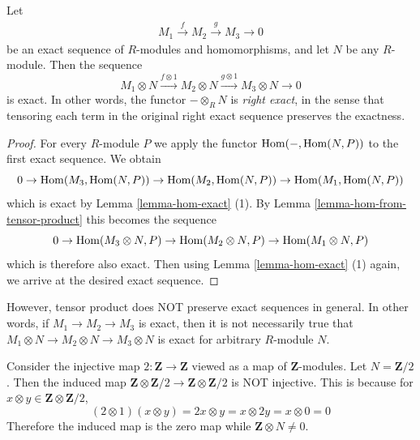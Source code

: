 \begin{lemma}
\label{lemma-tensor-product-exact}
Let
\begin{align*}
M_1\xrightarrow{f} M_2\xrightarrow{g} M_3 \to 0
\end{align*}
be an exact sequence of $R$-modules and homomorphisms, and let $N$ be any
$R$-module. Then the sequence
\begin{equation}
\label{equation-2ndex}
M_1\otimes N\xrightarrow{f \otimes 1} M_2\otimes N \xrightarrow{g \otimes 1}
M_3\otimes N \to 0
\end{equation}
is exact. In other words, the functor $- \otimes_R N$ is
{\it right exact}, in the sense that tensoring
each term in the original right exact sequence preserves the exactness.
\end{lemma}

\begin{proof}
For every $R$-module $P$
we apply the functor $\mathop{\mathrm{Hom}}\nolimits(-, \mathop{\mathrm{Hom}}\nolimits(N, P))$ to the first exact
sequence. We obtain
$$
0 \to
\mathop{\mathrm{Hom}}\nolimits(M_3, \mathop{\mathrm{Hom}}\nolimits(N, P)) \to
\mathop{\mathrm{Hom}}\nolimits(M_2, \mathop{\mathrm{Hom}}\nolimits(N, P)) \to
\mathop{\mathrm{Hom}}\nolimits(M_1, \mathop{\mathrm{Hom}}\nolimits(N, P))
$$
which is exact by Lemma \ref{lemma-hom-exact} (1).
By Lemma \ref{lemma-hom-from-tensor-product} this becomes the sequence
$$
0 \to \mathop{\mathrm{Hom}}\nolimits(M_3 \otimes N, P) \to
\mathop{\mathrm{Hom}}\nolimits(M_2 \otimes N, P) \to \mathop{\mathrm{Hom}}\nolimits(M_1 \otimes N, P)
$$
which is therefore also exact. Then using
Lemma \ref{lemma-hom-exact} (1) again, we arrive at the desired exact sequence.
\end{proof}

\begin{remark}
\label{remark-tensor-product-not-exact}
However, tensor product does NOT preserve exact sequences in general.
In other words, if $M_1 \to M_2 \to M_3$ is
exact, then it is not necessarily true that
$M_1 \otimes N \to M_2 \otimes N \to M_3 \otimes N$
is exact for arbitrary $R$-module $N$.
\end{remark}

\begin{example}
\label{example-tensor-product-not-exact}
Consider the injective map $2 : \mathbf{Z}\to \mathbf{Z}$
viewed as a map of $\mathbf{Z}$-modules.
Let $N = \mathbf{Z}/2$. Then the induced map
$\mathbf{Z} \otimes \mathbf{Z}/2 \to \mathbf{Z} \otimes \mathbf{Z}/2$
is NOT injective. This is because for
$x \otimes y\in \mathbf{Z} \otimes \mathbf{Z}/2$,
$$
(2 \otimes 1)(x \otimes y) = 2x \otimes y = x \otimes 2y = x \otimes 0 = 0
$$
Therefore the induced map is the zero map while $\mathbf{Z} \otimes N\neq 0$.
\end{example}

